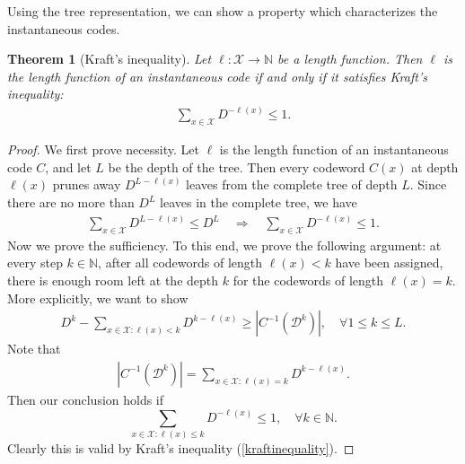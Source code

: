 \documentclass{article}
\numberwithin{equation}{section}
\newcommand{\bbN}{\mathbb{N}}
\renewcommand{\cal}{\mathcal}
\theoremstyle{plain}
\newtheorem{theorem}{Theorem}[section]
\theoremstyle{definition}
\begin{document}
Using the tree representation, we can show a property which characterizes the instantaneous codes.
\begin{theorem}[Kraft's inequality]\label{kraft}
Let $\ell:\cal{X}\to\bbN$ be a length function. Then $\ell$ is the length function of an instantaneous code if and only if it satisfies \textit{Kraft's inequality}:
\begin{align}
	\sum_{x\in\cal{X}}D^{-\ell(x)}\leq 1.\label{kraftinequality}
\end{align}
\end{theorem}
\begin{proof}
We first prove necessity. Let $\ell$ is the length function of an instantaneous code $C$, and let $L$ be the depth of the tree. Then every codeword $C(x)$ at depth $\ell(x)$ prunes away $D^{L-\ell(x)}$ leaves from the complete tree of depth $L$. Since there are no more than $D^L$ leaves in the complete tree, we have
\begin{align*}
	\sum_{x\in\cal{X}}D^{L-\ell(x)}\leq D^L\quad\Rightarrow\quad \sum_{x\in\cal{X}}D^{-\ell(x)}\leq 1.
\end{align*} 
Now we prove the sufficiency. To this end, we prove the following argument: at every step $k\in\bbN$, after all codewords of length $\ell(x)<k$ have been assigned, there is enough room left at the depth $k$ for the codewords of length $\ell(x)=k$. More explicitly, we want to show
\begin{align*}
	D^k-\sum_{x\in\cal{X}:\ell(x)<k} D^{k-\ell(x)}\geq\left\vert C^{-1}(\cal{D}^k)\right\vert,\quad\forall 1\leq k\leq L.
\end{align*}
Note that
\begin{align*}
	\left\vert C^{-1}(\cal{D}^k)\right\vert=\sum_{x\in\cal{X}:\ell(x)=k}D^{k-\ell(x)}.
\end{align*}
Then our conclusion holds if $$\sum_{x\in\cal{X}:\ell(x)\leq k}D^{-\ell(x)}\leq 1,\quad\forall k\in\bbN.$$ Clearly this is valid by Kraft's inequality (\ref{kraftinequality}).
\end{proof}
\end{document}

